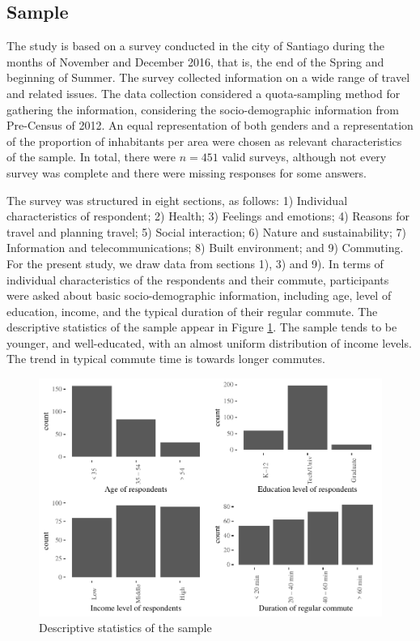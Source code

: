 \documentclass[]{elsarticle} %
\makeatletter
\def\maxwidth{\ifdim\Gin@nat@width>\linewidth\linewidth
\else\Gin@nat@width\fi}
\let\Oldincludegraphics\includegraphics
\renewcommand{\includegraphics}[1]{\Oldincludegraphics[width=\maxwidth]{#1}}
\makeatother
\begin{document}
\hypertarget{sample}{%
\subsection{Sample}\label{sample}}

The study is based on a survey conducted in the city of Santiago during
the months of November and December 2016, that is, the end of the Spring
and beginning of Summer. The survey collected information on a wide
range of travel and related issues. The data collection considered a
quota-sampling method for gathering the information, considering the
socio-demographic information from Pre-Census of 2012. An equal
representation of both genders and a representation of the proportion of
inhabitants per area were chosen as relevant characteristics of the
sample. In total, there were \(n=451\) valid surveys, although not every
survey was complete and there were missing responses for some answers.

The survey was structured in eight sections, as follows: 1) Individual
characteristics of respondent; 2) Health; 3) Feelings and emotions; 4)
Reasons for travel and planning travel; 5) Social interaction; 6) Nature
and sustainability; 7) Information and telecommunications; 8) Built
environment; and 9) Commuting. For the present study, we draw data from
sections 1), 3) and 9). In terms of individual characteristics of the
respondents and their commute, participants were asked about basic
socio-demographic information, including age, level of education,
income, and the typical duration of their regular commute. The
descriptive statistics of the sample appear in Figure
\ref{fig:descriptive-statistics}. The sample tends to be younger, and
well-educated, with an almost uniform distribution of income levels. The
trend in typical commute time is towards longer commutes.

\begin{figure}
\centering
\includegraphics{Dissonance_Santiago_v1_files/figure-latex/plot-descriptive-statistics-1.pdf}
\caption{\label{fig:descriptive-statistics}Descriptive statistics of the
sample}
\end{figure}
\end{document}
